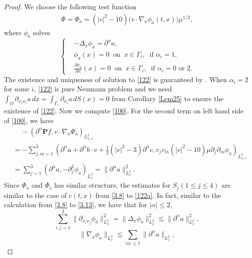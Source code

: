 \documentclass[reqno,a4paper]{amsart}
\numberwithin{equation}{section}
\newcommand{\1}{\mathbf{1}}
\renewcommand{\P}{\mathbf{P}}
\newcommand{\pa}{\partial}
\newcommand{\<}{\langle}
\renewcommand{\>}{\rangle}
\renewcommand{\P}{\mathbf{P}}
\begin{document}
\begin{proof}
		
		\medskip{} We choose the following test function
		\begin{align*}
			{\Phi} = {\Phi_{a}} = (|v|^2-10)\big(v\cdot{\nabla_{x}\phi_{a}}(t,x)\big)\mu^{1/2},
		\end{align*}
		where $\phi_a$ solves 
		\begin{equation}\label{122}\left\{\begin{aligned}
				&-\Delta_x \phi_a = {\partial^\alpha a},\\
				&{\phi_a}(x)= 0 \ \text{ on }\ x\in \Gamma_i,\ \text{ if }\alpha_i = 1,\\
				&\frac{\partial\phi_a}{\partial n}(x)= 0\ \text{ on }\ x\in \Gamma_i,\ \text{ if }\alpha_i = 0\text{ or } 2.
			\end{aligned}\right.
\end{equation}
	The existence and uniqueness of solution to \eqref{122} is guaranteed by \cite[Lamma 4.4.3.1]{Grisvard1985}. When $\alpha_i=2$ for some $i$, \eqref{122} is pure Neumann problem and we need $\int_{\Omega}\partial_{x_ix_i}a\,dx=\int_{\Gamma_i}\partial_{x_i}a\,dS(x)=0$ from Corollary \ref{Lem25} to ensure the existence of \eqref{122}. 
		Now we compute \eqref{100}. For the second term on left hand side of \eqref{100}, we have 
		\begin{align*}
			&\quad\,-({\partial^\alpha \P f},v\cdot{\nabla_{x}\Phi_{a}})_{L^2_{x,v}} \\
			&= -\sum_{j,m=1}^3({\partial^\alpha a}+{\partial^\alpha b}\cdot v+\frac{1}{2}(|v|^2-3){\partial^\alpha c} ,v_jv_m(|v|^2-10)\mu{\partial_j\partial_m\phi_{a}})_{L^2_{x,v}} \\
			&= \sum_{j=1}^3({\partial^\alpha a} ,{-\partial^2_j\phi_{a}})_{L^2_{x}}  = \|{\partial^\alpha a}\|^2_{L^2_{x}} .
		\end{align*}
		Since $\Phi_a$ and $\Phi_c$ has similar structure, the estimates for $S_j$$(1\le j\le 4)$ are similar to the case of $c(t,x)$ from \eqref{3.8} to \eqref{122a}. In fact, similar to the calculation from \eqref{3.8} to \eqref{3.13}, we have that for $|\alpha|\le 2$, 
		\begin{equation}\label{3.32}
			\sum_{i,j=1}^3\|\partial_{x_ix_j}\phi_a\|^2_{L^2_x}=\|\Delta_x\phi_a\|^2_{L^2_x}\lesssim \|\partial^\alpha a\|^2_{L^2_x},
		\end{equation}
	\begin{equation}\label{3.33}
		\|\nabla_x\phi_a\|_{L^2_x}\lesssim \sum_{|\alpha|\le1}\|\pa^\alpha a\|_{L^2_x},
	\end{equation}
$$
\end{proof}
\end{document}
